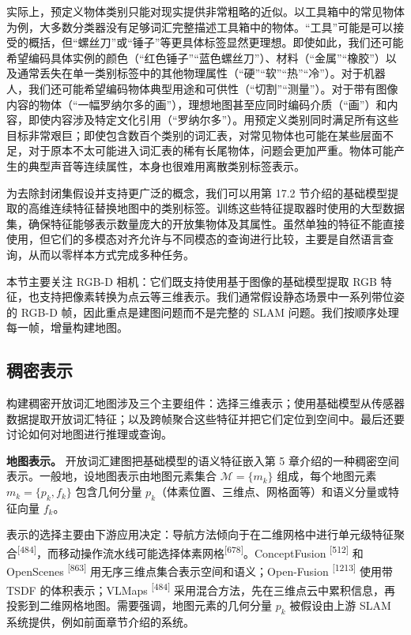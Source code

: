 实际上，预定义物体类别只能对现实提供非常粗略的近似。以工具箱中的常见物体为例，大多数分类器没有足够词汇完整描述工具箱中的物体。“工具”可能是可以接受的概括，但“螺丝刀”或“锤子”等更具体标签显然更理想。即使如此，我们还可能希望编码具体实例的颜色（“红色锤子”“蓝色螺丝刀”）、材料（“金属”“橡胶”）以及通常丢失在单一类别标签中的其他物理属性（“硬”“软”“热”“冷”）。对于机器人，我们还可能希望编码物体典型用途和可供性（“切割”“测量”）。对于带有图像内容的物体（“一幅罗纳尔多的画”），理想地图甚至应同时编码介质（“画”）和内容，即使内容涉及特定文化引用（“罗纳尔多”）。用预定义类别同时满足所有这些目标非常艰巨；即使包含数百个类别的词汇表，对常见物体也可能在某些层面不足，对于原本不太可能进入词汇表的稀有长尾物体，问题会更加严重。物体可能产生的典型声音等连续属性，本身也很难用离散类别标签表示。

为去除封闭集假设并支持更广泛的概念，我们可以用第 17.2 节介绍的基础模型提取的高维连续特征替换地图中的类别标签。训练这些特征提取器时使用的大型数据集，确保特征能够表示数量庞大的开放集物体及其属性。虽然单独的特征不能直接使用，但它们的多模态对齐允许与不同模态的查询进行比较，主要是自然语言查询，从而以零样本方式完成多种任务。

本节主要关注 RGB-D 相机：它们既支持使用基于图像的基础模型提取 RGB 特征，也支持把像素转换为点云等三维表示。我们通常假设静态场景中一系列带位姿的 RGB-D 帧，因此重点是建图问题而不是完整的 SLAM 问题。我们按顺序处理每一帧，增量构建地图。

\subsection{稠密表示}

构建稠密开放词汇地图涉及三个主要组件：选择三维表示；使用基础模型从传感器数据提取开放词汇特征；以及跨帧聚合这些特征并把它们定位到空间中。最后还要讨论如何对地图进行推理或查询。

\textbf{地图表示。} 开放词汇建图把基础模型的语义特征嵌入第 5 章介绍的一种稠密空间表示。一般地，设地图表示由地图元素集合 $\mathcal{M}=\{m_k\}$ 组成，每个地图元素 $m_k=\{p_k,f_k\}$ 包含几何分量 $p_k$（体素位置、三维点、网格面等）和语义分量或特征向量 $f_k$。

表示的选择主要由下游应用决定：导航方法倾向于在二维网格中进行单元级特征聚合\textsuperscript{[484]}，而移动操作流水线可能选择体素网格\textsuperscript{[678]}。ConceptFusion \textsuperscript{[512]} 和 OpenScenes \textsuperscript{[863]} 用无序三维点集合表示空间和语义；Open-Fusion \textsuperscript{[1213]} 使用带 TSDF 的体积表示；VLMaps \textsuperscript{[484]} 采用混合方法，先在三维点云中累积信息，再投影到二维网格地图。需要强调，地图元素的几何分量 $p_k$ 被假设由上游 SLAM 系统提供，例如前面章节介绍的系统。

